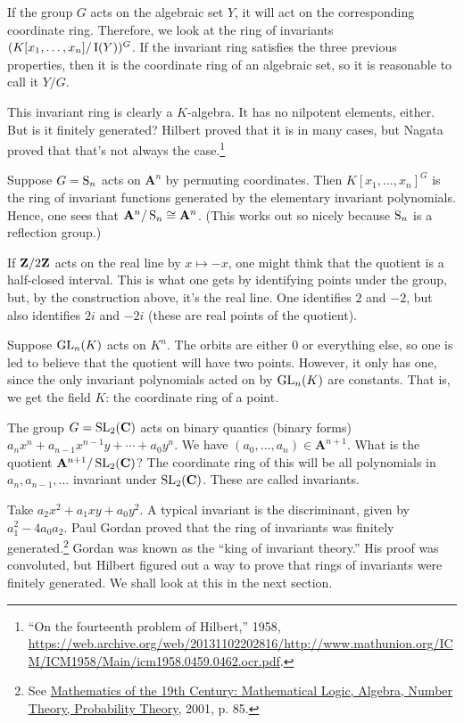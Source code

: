 \documentclass[11pt, oneside,margin=1in]{article}
\begin{document}
If the group $G$ acts on the algebraic set $Y$, it will act on the corresponding coordinate ring. Therefore, we look at the ring of invariants $(K[x_1,\hdots,x_n]/\operatorname{I}(Y))^G$. If the invariant ring satisfies the three previous properties, then it is the coordinate ring of an algebraic set, so it is reasonable to call it $Y/G$.

This invariant ring is clearly a $K$-algebra. It has no nilpotent elements, either. But is it finitely generated? Hilbert proved that it is in many cases, but Nagata proved that that's not always the case.\footnote{``On the fourteenth problem of Hilbert,'' 1958, \url{https://web.archive.org/web/20131102202816/http://www.mathunion.org/ICM/ICM1958/Main/icm1958.0459.0462.ocr.pdf}.}

\begin{example}[ ]\label{}\text{}
Suppose $G=\operatorname{S}_n$ acts on $\mathbf{A}^n$ by permuting coordinates. Then $K[x_1,\hdots, x_n]^G$ is the ring of invariant functions generated by the elementary invariant polynomials. Hence, one sees that $\mathbf{A}^n/\operatorname{S}_n\cong \mathbf{A}^n$. (This works out so nicely because $\operatorname{S}_n$ is a reflection group.)
\end{example}


If $\mathbf Z / 2\mathbf Z$ acts on the real line by $x\longmapsto -x$, one might think that the quotient is a half-closed interval. This is what one gets by identifying points under the group, but, by the construction above, it's the real line. One identifies $2$ and $-2$, but also identifies $2i$ and $-2i$ (these are real points of the quotient).


 \begin{example}[ ]\label{}\text{}
Suppose $\operatorname{GL}_{n}(K)$ acts on $K^n$. The orbits are either $0$ or everything else, so one is led to believe that the quotient will have two points. However, it only has one, since the only invariant polynomials acted on by $\operatorname{GL}_{n}(K)$ are constants. That is, we get the field $K$: the coordinate ring of a point.
\end{example}

\begin{example}\label{}\text{}
The group $G=\operatorname{SL}_{2}(\mathbf{C})$ acts on binary quantics (binary forms) $a_nx^n + a_{n-1}x^{n-1}y + \cdots +a_0y^n$. We have $(a_0,\hdots, a_n)\in \mathbf{A}^{n+1}$. What is the quotient $\mathbf{A}^{n+1}/\operatorname{SL}_{2}(\mathbf{C})$? The coordinate ring of this will be all polynomials in $a_n,a_{n-1},\hdots$ invariant under $\operatorname{SL}_{2}(\mathbf{C})$. These are called invariants. 

Take $a_2x^2 + a_1xy + a_0y^2$. A typical invariant is the discriminant, given by $a_1^2 - 4a_0a_2$. Paul Gordan proved that the ring of invariants was finitely generated.\footnote{See \underline{Mathematics of the 19th Century: Mathematical Logic, Algebra, Number Theory, Probability Theory}, 2001, p. 85.} Gordan was known as the ``king of invariant theory.'' His proof was convoluted, but Hilbert figured out a way to prove that rings of invariants were finitely generated. We shall look at this in the next section.
\end{example}
\end{document}
